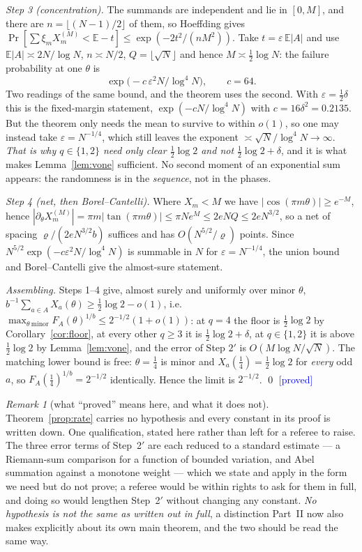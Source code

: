 \documentclass[11pt,a4paper]{article}
\theoremstyle{plain}
\theoremstyle{definition}
\theoremstyle{remark}
\newtheorem{remark}[theorem]{Remark}
\newcommand{\STATUS}[1]{\textcolor{blue}{\textsf{[#1]}}}
\begin{document}
\emph{Step 3 (concentration).} The summands are independent and lie in $[0,M]$, and there are
$n=\lfloor(N-1)/2\rfloor$ of them, so Hoeffding gives
$\Pr[\sum\xi_mX^{(M)}_m<\mathbb{E}-t]\le\exp(-2t^2/(nM^2))$. Take $t=\varepsilon\,\mathbb{E}|A|$
and use $\mathbb{E}|A|\asymp2N/\log N$, $n\asymp N/2$, $Q=\lfloor\sqrt N\rfloor$ and hence
$M\asymp\tfrac12\log N$: the failure probability at one $\theta$ is
\[
   \exp\bigl(-c\,\varepsilon^2N/\log^4N\bigr),\qquad c=64 .
\]
Two readings of the same bound, and the theorem uses the second. With $\varepsilon=\tfrac12\delta$
this is the fixed-margin statement, $\exp(-cN/\log^4N)$ with $c=16\delta^2=0.2135$. But the
theorem only needs the mean to survive to within $o(1)$, so one may instead take
$\varepsilon=N^{-1/4}$, which still leaves the exponent $\asymp\sqrt N/\log^4N\to\infty$.
\emph{That is why $q\in\{1,2\}$ need only clear $\tfrac12\log2$ and not $\tfrac12\log2+\delta$},
and it is what makes Lemma~\ref{lem:vone} sufficient. No second moment of an exponential sum
appears: the randomness is in the \emph{sequence}, not in the phases.

\emph{Step 4 (net, then Borel--Cantelli).} Where $X_m<M$ we have $|\cos(\pi m\theta)|\ge e^{-M}$,
hence $|\partial_\theta X^{(M)}_m|=\pi m|\tan(\pi m\theta)|\le\pi Ne^{M}\le2eNQ\le2eN^{3/2}$, so
a net of spacing $\varrho/(2eN^{3/2}b)$ suffices and has $O(N^{5/2}/\varrho)$ points. Since
$N^{5/2}\exp(-c\varepsilon^2N/\log^4N)$ is summable in $N$ for $\varepsilon=N^{-1/4}$, the union
bound and Borel--Cantelli give the almost-sure statement.

\emph{Assembling.} Steps 1--4 give, almost surely and uniformly over minor $\theta$,
$b^{-1}\sum_{a\in A}X_a(\theta)\ge\tfrac12\log2-o(1)$, i.e.\
$\max_{\theta\ \mathrm{minor}}F_A(\theta)^{1/b}\le2^{-1/2}(1+o(1))$: at $q=4$ the floor is
$\tfrac12\log2$ by Corollary~\ref{cor:floor}, at every other $q\ge3$ it is $\tfrac12\log2+\delta$,
at $q\in\{1,2\}$ it is above $\tfrac12\log2$ by Lemma~\ref{lem:vone}, and the error of Step $2'$
is $O(M\log N/\sqrt N)$. The matching lower bound is free: $\theta=\tfrac14$ is minor and
$X_a(\tfrac14)=\tfrac12\log2$ for \emph{every} odd $a$, so $F_A(\tfrac14)^{1/b}=2^{-1/2}$
identically. Hence the limit is $2^{-1/2}$. \qed
\STATUS{proved}

\begin{remark}[what ``proved'' means here, and what it does not]\label{rem:ratestatus}
Theorem~\ref{prop:rate} carries no hypothesis and every constant in its proof is written down.
One qualification, stated here rather than left for a referee to raise. The three error terms of
Step~2$'$ are each reduced to a standard estimate --- a Riemann-sum comparison for a function of
bounded variation, and Abel summation against a monotone weight --- which we state and apply
in the form we need but do not prove; a referee would be within rights to ask for them in full,
and doing so would lengthen Step~2$'$ without changing any constant. \emph{No hypothesis is not
the same as written out in full}, a distinction Part~II now also makes explicitly
about its own main theorem, and the two should be read the same way.
\end{remark}
\end{document}
